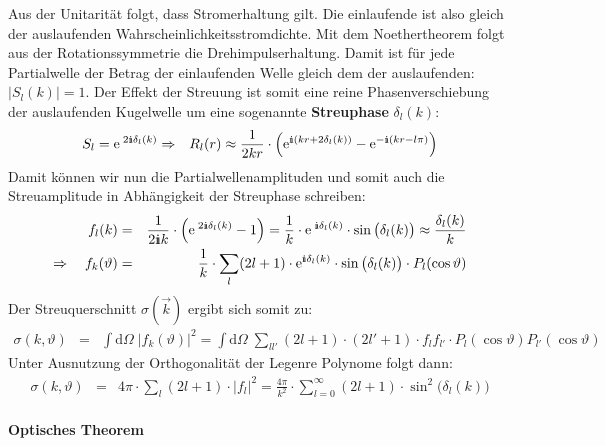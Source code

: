 Aus der Unitarität folgt, dass Stromerhaltung gilt. Die einlaufende ist also gleich der auslaufenden Wahrscheinlichkeitsstromdichte. Mit dem Noethertheorem folgt aus der Rotationssymmetrie die Drehimpulserhaltung. Damit ist für jede Partialwelle der Betrag der einlaufenden Welle gleich dem der auslaufenden: $|S_l(k)|=1$. Der Effekt der Streuung ist somit eine reine Phasenverschiebung der auslaufenden Kugelwelle um eine sogenannte {\bf Streuphase} $\delta_l(k)$:  
\begin{eqnarray*}
	S_l = \e^{\;2\I\delta_l(k)} &\Rightarrow& R_l(r) \approx \frac 1 {2kr} \cdot\Big(\e^{\I(kr+2\delta_l(k))} - \e^{-\I(kr -l\pi)}\Big)
\end{eqnarray*}
Damit können wir nun die Partialwellenamplituden und somit auch die Streuamplitude in Abhängigkeit der Streuphase schreiben: 
\begin{eqnarray*}
	f_l(k) &=& \frac{1}{2\I k} \cdot\Big( \e^{\;2\I\delta_l(k)} -1\Big) = \frac{1}{k}\cdot \e^{\;\I\delta_l(k)}\cdot \sin\big(\delta_l(k)\big) \approx \frac{\delta_l(k)}{k}
	\\
	\Rightarrow\quad f_k(\vartheta) &=& \frac{1}{k} \cdot\sum_l (2l + 1)\cdot \e^{\I\delta_l(k)}\cdot \sin\big(\delta_l(k)\big)\cdot P_l(\cos\vartheta)
\end{eqnarray*}
Der Streuquerschnitt $\sigma(\vec{k})$ ergibt sich somit zu:
\begin{eqnarray*} 
	\sigma(k,\vartheta) &=& \int\mathrm{d}\Omega\; \big|f_k(\vartheta) \big|^2 = \int\mathrm{d}\Omega\; \sum_{ll'} (2l + 1)\cdot(2l' +1 )\cdot f_l f_{l'}\cdot P_l(\cos\vartheta)P_{l'}(\cos\vartheta) 
\end{eqnarray*}
Unter Ausnutzung der Orthogonalität der Legenre Polynome folgt dann: 
\begin{eqnarray} 
	\sigma(k,\vartheta) &=& 4 \pi \cdot\sum_{l} (2l + 1)\cdot |f_l|^2 = \frac{4\pi}{k^2}\cdot\sum_{l=0}^{\infty} (2l + 1)\cdot\sin^{2}\big(\delta_l(k)\big) \label{Streuquerschnit} 
\end{eqnarray}


\paragraph{Optisches Theorem}

